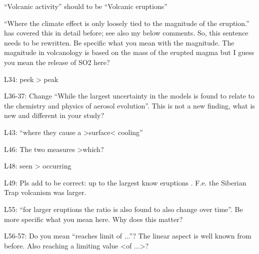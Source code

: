 \documentclass{reviewresponse}
\let\citeA\shortciteA %
\begin{document}
  \begin{revcomment}[colframe={colorcommentresolved}]
    ``Volcanic activity'' should to be ``Volcanic eruptions''
  \end{revcomment}
  \begin{revcomment}[colframe={colorcommentresolved}]
    ``Where the climate effect is only loosely tied to the magnitude of the eruption.''
    \citeA{metzner2014} has covered this in detail before; see also my below comments.
    So, this sentence needs to be rewritten. Be specific what you mean with the
    magnitude. The magnitude in volcanology is based on the mass of the erupted magma
    but I guess you mean the release of SO2 here?
  \end{revcomment}
  \begin{revcomment}[colframe={colorcommentresolved}]
    L34: peek {\textgreater} peak
  \end{revcomment}
  \begin{revcomment}[colframe={colorcommentresolved}]
    L36-37: Change ``While the largest uncertainty in the models is found to relate to
    the chemistry and physics of aerosol evolution''. This is not a new finding, what is
    new and different in your study?
  \end{revcomment}
  \begin{revcomment}[colframe={colorcommentresolved}]
    L43: ``where they cause a {\textgreater}surface{\textless} cooling''
  \end{revcomment}
  \begin{revcomment}[colframe={colorcommentresolved}]
    L46: The two measures {\textgreater}which?
  \end{revcomment}
  \begin{revcomment}[colframe={colorcommentresolved}]
    L48: seen {\textgreater} occurring
  \end{revcomment}
  \begin{revcomment}[colframe={colorcommentresolved}]
    L49: Pls add to be correct: up to the largest know eruptions . F.e. the Siberian
    Trap volcanism was larger.
  \end{revcomment}
  \begin{revcomment}[colframe={colorcommentresolved}]
    L55: ``for larger eruptions the ratio is also found to also change over time''. Be
    more specific what you mean here. Why does this matter?
  \end{revcomment}
  \begin{revcomment}[colframe={colorcommentresolved}]
    L56-57: Do you mean ``reaches limit of ...''? The linear aspect is well known from
    before. Also reaching a limiting value {\textless}of ...{\textgreater}?
  \end{revcomment}
\end{document}
